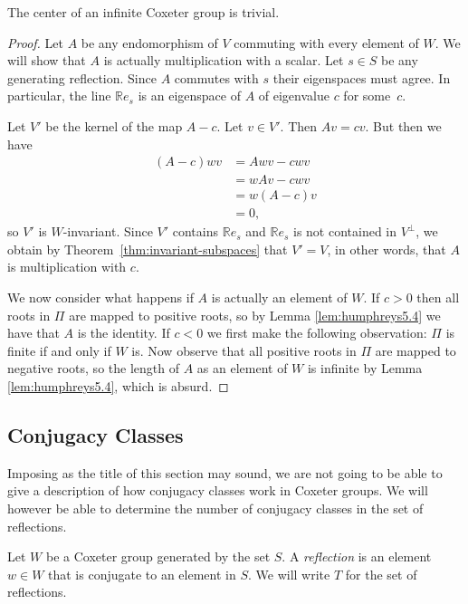 \documentclass[main.tex]{subfiles}
\begin{document}
\begin{corollary}
	The center of an infinite Coxeter group is trivial.
\end{corollary}

\begin{proof}
Let $A$ be any endomorphism of $V$ commuting with every element of $W$. We will show that $A$ is actually multiplication with a scalar. Let $s \in S$ be any generating reflection. Since $A$ commutes with $s$ their eigenspaces must agree. In particular, the line $\mathbb{R}e_s$ is an eigenspace of $A$ of eigenvalue $c$ for some~$c$. 

Let $V'$ be the kernel of the map $A-c$. Let $v \in V'$. Then $Av = cv$. But then we have
\begin{align*}
	(A-c)wv & = Awv - cwv \\
			& = wAv - cwv \\
			& = w(A - c) v \\
			& = 0,
\end{align*}
so $V'$ is $W$-invariant. Since $V'$ contains $\mathbb{R}e_s$ 
and $\mathbb{R}e_s$ is not contained in $V^\perp$, we 
obtain by Theorem~\ref{thm:invariant-subspaces} that $V' = V$, 
in other words, that $A$ is multiplication with $c$.

We now consider what happens if $A$ is actually an element of 
$W$. If $c > 0$ then all roots in $\Pi$ are mapped to positive 
roots, so by Lemma \ref{lem:humphreys5.4} we have that $A$ is 
the identity. If $c < 0$ we first make the following 
observation: $\Pi$ is finite if and only if $W$ is. Now observe 
that all positive roots in $\Pi$ are mapped to negative roots, 
so the length of $A$ as an element of $W$ is infinite by Lemma 
\ref{lem:humphreys5.4}, which is absurd.
\end{proof}

\subsection{Conjugacy Classes}\label{subsec:conjugacy-classes}
Imposing as the title of this section may sound, we are not 
going to be able to give a description of how conjugacy classes 
work in Coxeter groups. We will however be able to determine the 
number of conjugacy classes in the set of reflections.

Let $W$ be a Coxeter group generated by the set $S$. A 
\textit{reflection} is an element $w \in W$ that is conjugate to 
an element in $S$. We will write $T$ for the set of reflections.
\end{document}
